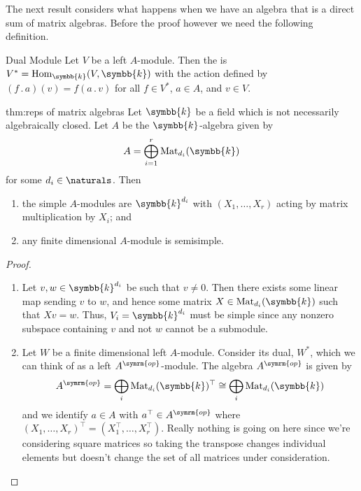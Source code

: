 \documentclass[fleqn]{NotesClass}
\renewcommand{\field}{\symbb{k}}
\DeclareMathOperator{\Hom}{Hom}
\newcommand{\action}{\mathbin{.}}
\newcommand{\op}{\symrm{op}}
\newcommand{\isomorphic}{\cong}
\newcommand{\trans}{\top}
\begin{document}
    The next result considers what happens when we have an algebra that is a direct sum of matrix algebras.
    Before the proof however we need the following definition.
    
    \begin{dfn}{Dual Module}{}
        Let \(V\) be a left \(A\)-module.
        Then the  is \(V^* = \Hom_{\field}(V, \field)\) with the action defined by \((f \action a)(v) = f(a \action v)\) for all \(f \in V^*\), \(a \in A\), and \(v \in V\).
    \end{dfn}
    
    \begin{thm}{}{thm:reps of matrix algebras}
        Let \(\field\) be a field which is not necessarily algebraically closed.
        Let \(A\) be the \(\field\)-algebra given by
        \begin{equation}
            A = \bigoplus_{i=1}^r \matrices{d_i}{\field}
        \end{equation}
        for some \(d_i \in \naturals\).
        Then
        \begin{enumerate}
            \item the simple \(A\)-modules are \(\field^{d_i}\) with \((X_1, \dotsc, X_r)\) acting by matrix multiplication by \(X_i\); and
            \item any finite dimensional \(A\)-module is semisimple.
        \end{enumerate}
        \begin{proof}
            \begin{enumerate}
                \item Let \(v, w \in \field^{d_i}\) be such that \(v \ne 0\).
                Then there exists some linear map sending \(v\) to \(w\), and hence some matrix \(X \in \matrices{d_i}{\field}\) such that \(Xv = w\).
                Thus, \(V_i = \field^{d_i}\) must be simple since any nonzero subspace containing \(v\) and not \(w\) cannot be a submodule.
                \item Let \(W\) be a finite dimensional left \(A\)-module.
                Consider its dual, \(W^*\), which we can think of as a left \(A^{\op}\)-module.
                The algebra \(A^{\op}\) is given by
                \begin{equation}
                    A^{\op} = \bigoplus_{i} \matrices{d_i}{\field}^{\trans} \isomorphic \bigoplus_i \matrices{d_i}{\field}
                \end{equation}
                and we identify \(a \in A\) with \(a^{\trans} \in A^{\op}\) where \((X_1, \dotsc, X_r)^{\trans} = (X_1^{\trans}, \dotsc, X_r^{\trans})\).
                Really nothing is going on here since we're considering square matrices so taking the transpose changes individual elements but doesn't change the set of all matrices under consideration.
                

\end{enumerate}
\end{proof}
\end{thm}
\end{document}
